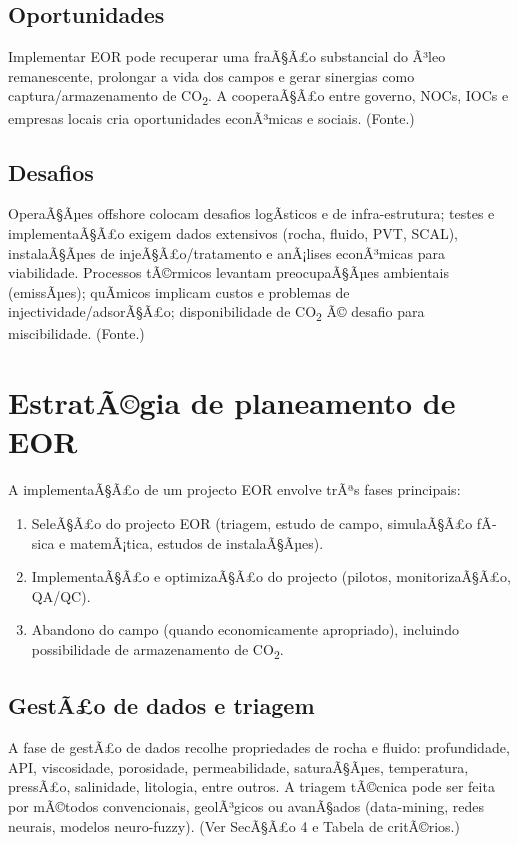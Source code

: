 \documentclass[11pt,a4paper]{article}
\begin{document}
\subsection{Oportunidades}
Implementar EOR pode recuperar uma fraÃ§Ã£o substancial do Ã³leo remanescente, prolongar a vida dos campos e gerar sinergias como captura/armazenamento de CO\textsubscript{2}. A cooperaÃ§Ã£o entre governo, NOCs, IOCs e empresas locais cria oportunidades econÃ³micas e sociais. (Fonte.)

\subsection{Desafios}
OperaÃ§Ãµes offshore colocam desafios logÃ­sticos e de infra-estrutura; testes e implementaÃ§Ã£o exigem dados extensivos (rocha, fluido, PVT, SCAL), instalaÃ§Ãµes de injeÃ§Ã£o/tratamento e anÃ¡lises econÃ³micas para viabilidade. Processos tÃ©rmicos levantam preocupaÃ§Ãµes ambientais (emissÃµes); quÃ­micos implicam custos e problemas de injectividade/adsorÃ§Ã£o; disponibilidade de CO\textsubscript{2} Ã© desafio para miscibilidade. (Fonte.)

\section{EstratÃ©gia de planeamento de EOR}
A implementaÃ§Ã£o de um projecto EOR envolve trÃªs fases principais:
\begin{enumerate}
  \item SeleÃ§Ã£o do projecto EOR (triagem, estudo de campo, simulaÃ§Ã£o fÃ­sica e matemÃ¡tica, estudos de instalaÃ§Ãµes).
  \item ImplementaÃ§Ã£o e optimizaÃ§Ã£o do projecto (pilotos, monitorizaÃ§Ã£o, QA/QC).
  \item Abandono do campo (quando economicamente apropriado), incluindo possibilidade de armazenamento de CO\textsubscript{2}.
\end{enumerate}

\subsection{GestÃ£o de dados e triagem}
A fase de gestÃ£o de dados recolhe propriedades de rocha e fluido: profundidade, API, viscosidade, porosidade, permeabilidade, saturaÃ§Ãµes, temperatura, pressÃ£o, salinidade, litologia, entre outros. A triagem tÃ©cnica pode ser feita por mÃ©todos convencionais, geolÃ³gicos ou avanÃ§ados (data-mining, redes neurais, modelos neuro-fuzzy). (Ver SecÃ§Ã£o 4 e Tabela de critÃ©rios.)
\end{document}
